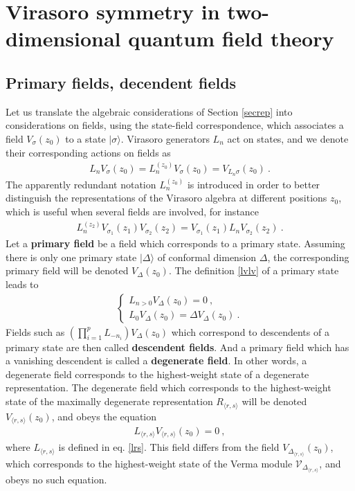 \documentclass[12pt, a4paper, notitlepage, twoside]{report}
\numberwithin{equation}{section}
\theoremstyle{break}
\begin{document}
\section{Virasoro symmetry in two-dimensional quantum field theory\label{seclin}}

\subsection{Primary fields, decendent fields}

Let us translate the algebraic considerations of Section \ref{secrep} into considerations on fields, using the state-field correspondence,
which associates a field $V_\sigma(z_0)$ to a state $|\sigma\rangle$.
Virasoro generators $L_n$ act on states, and we denote their corresponding actions on fields as 
\begin{align}
 L_nV_\sigma(z_0) = L_n^{(z_0)}V_\sigma(z_0) = V_{L_n\sigma}(z_0)\ .
\label{lnzv}
\end{align}
The apparently redundant notation $L_n^{(z_0)}$ is introduced in order to better distinguish the representations of the Virasoro algebra at different positions $z_0$, which is useful when several fields are involved, for instance 
\begin{align}
 L_n^{(z_2)} V_{\sigma_1}(z_1)V_{\sigma_2}(z_2) = V_{\sigma_1}(z_1) L_nV_{\sigma_2}(z_2)\ .
\end{align}
Let a \textbf{\boldmath primary field} be a field which corresponds to a primary state.
Assuming there is only one primary state $|\Delta\rangle$ of conformal dimension $\Delta$, the corresponding primary field will be denoted
$V_\Delta(z_0)$.
The definition \eqref{lvlv} of a primary state leads to 
\begin{align}
\boxed{
 \left\{\begin{array}{l}  L_{n>0} V_\Delta(z_0) = 0 \ , 
\\
L_0 V_\Delta(z_0) = \Delta V_\Delta(z_0) \ .
\end{array}\right. 
}
\label{ldld}
\end{align}
Fields such as  $\left(\prod_{i=1}^p L_{-n_i}\right) V_\Delta(z_0)$ which correspond to descendents of a primary state are then called  \textbf{descendent fields}.
And a primary field which has a vanishing descendent is called a \textbf{\boldmath degenerate field}.
In other words, a degenerate field corresponds to the highest-weight state of a degenerate representation.
The degenerate field which corresponds to the highest-weight state of the maximally degenerate representation $R_{\langle r,s \rangle}$ will be denoted $V_{\langle r,s\rangle}(z_0)$, and obeys the equation 
\begin{align}
 L_{\langle r,s \rangle} V_{\langle r,s \rangle}(z_0) = 0 \ , 
\label{lrsv}
\end{align}
where $L_{\langle r,s \rangle}$ is defined in eq. \eqref{lrs}.
This field differs from the field $V_{\Delta_{\langle r,s \rangle}}(z_0)$, which corresponds to the highest-weight state of the Verma module $\mathcal{V}_{\Delta_{\langle r,s \rangle}}$, and obeys no such equation.
\end{document}
